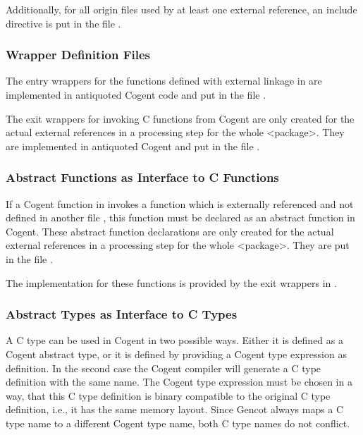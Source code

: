 Additionally, for all origin files used by at least one external reference, an include directive is put in the file
.

\subsubsection{Wrapper Definition Files}

The entry wrappers for the functions defined with external linkage in  are implemented in antiquoted Cogent code and
put in the file . 

The exit wrappers for invoking C functions from Cogent are only created for the actual
external references in a processing step for the whole <package>. They are implemented in antiquoted Cogent
and put in the file .

\subsubsection{Abstract Functions as Interface to C Functions}

If a Cogent function in  invokes a function which is externally referenced and not defined in another
file , this function must be declared as an abstract function in Cogent. These abstract function declarations
are only created for the actual
external references in a processing step for the whole <package>. They are put in the file .

The implementation for these functions is provided by the exit wrappers in .

\subsubsection{Abstract Types as Interface to C Types}

A C type can be used in Cogent in two possible ways. Either it is defined as a Cogent abstract type, or it is defined by providing
a Cogent type expression as definition. In the second case the Cogent compiler will generate a C type definition with the
same name. The Cogent type expression must be chosen in a way, that this C type definition is binary compatible to the
original C type definition, i.e., it has the same memory layout. Since Gencot always maps a C type name to a different Cogent
type name, both C type names do not conflict.

